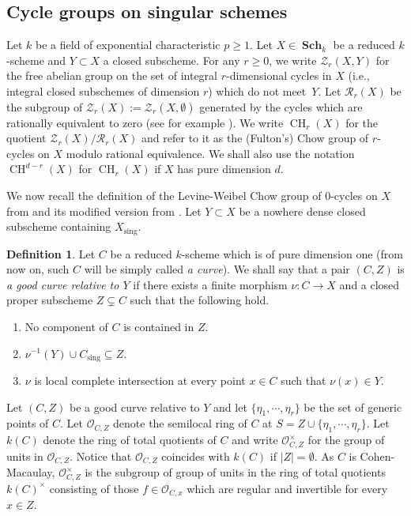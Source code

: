 \documentclass[JEP,XML,SOM,Unicode,published]{cedram}
\let\mathcal\mathscr
\theoremstyle{definition}
\newtheorem{defn}[thm]{Definition}
\newcommand{\sO}{{\mathcal O}}\let\cO\sO
\newcommand{\sR}{{\mathcal R}}
\newcommand{\sZ}{{\mathcal Z}}
\DeclareMathOperator{\CH}{CH}
\DeclareMathOperator{\Sch}{\mathbf{Sch}}
\newcommand{\sing}{\mathrm{sing}}
\begin{document}
\subsection{Cycle groups on singular schemes}\label{ssec:$0$-cycles-singschemes}
Let $k$ be a field of exponential characteristic $p \ge 1$. Let $X\in \Sch_k$ be a reduced $k$-scheme and $Y \subset X$ a closed subscheme. For any $r\geq 0$, we write
$\sZ_r(X,Y)$ for the free abelian group on the set of integral $r$\nobreakdash-dimen\-sional cycles in $X$ (i.e., integral closed subschemes of dimension $r$) which do not meet~$Y$.
Let $\sR_r(X)$ be the subgroup of $\sZ_r(X) := \sZ_r(X, \emptyset)$ generated by the cycles which are rationally equivalent to zero (see for example \cite[\S 1]{Fulton}). We write $\CH_r(X)$ for the quotient $\sZ_r(X)/\sR_r(X)$ and refer to it as the (Fulton's) Chow group of $r$-cycles on $X$ modulo rational equivalence.
We shall also use the notation $\CH^{d-r}(X)$ for $\CH_r(X)$ if $X$ has pure
dimension $d$.

We now recall the definition of the Levine-Weibel Chow group of $0$-cycles on $X$ from
\cite{LW} and its modified version from \cite{BK}.
Let $Y \subset X$ be a nowhere dense closed subscheme containing $X_\sing$.

\begin{defn}\label{defn:$0$-cycle-S-1}
Let $C$ be a reduced $k$-scheme which is of pure dimension one (from now on, such $C$ will be simply called \emph{a curve}).
We shall say that a pair $(C, Z)$ is \emph{a good curve
relative to $Y$} if there exists a finite morphism $\nu\colon C \to X$
and a closed proper subscheme $Z \subsetneq C$ such that the following hold.
\begin{enumerate}
\item
No component of $C$ is contained in $Z$.
\item
$\nu^{-1}(Y) \cup C_{\sing}\subseteq Z$.
\item
$\nu$ is local complete intersection at every
point $x \in C$ such that $\nu(x) \in Y$.
\end{enumerate}
\end{defn}

Let $(C, Z)$ be a good curve relative to $Y$ and let
$\{\eta_1, \cdots , \eta_r\}$ be the set of generic points of $C$.
Let $\sO_{C,Z}$ denote the semilocal ring of $C$ at
$S = Z \cup \{\eta_1, \cdots , \eta_r\}$.
Let $k(C)$ denote the ring of total
quotients of $C$ and write $\sO_{C,Z}^\times$ for the group of units in
$\sO_{C,Z}$. Notice that $\sO_{C,Z}$ coincides with $k(C)$
if $|Z| = \emptyset$.
As $C$ is Cohen-Macaulay, $\sO_{C,Z}^\times$ is the subgroup of group of units
in the ring of total quotients $k(C)^\times$
consisting of those $f\in \sO_{C,x}$ which are regular and invertible for
every $x\in Z$.
\end{document}
